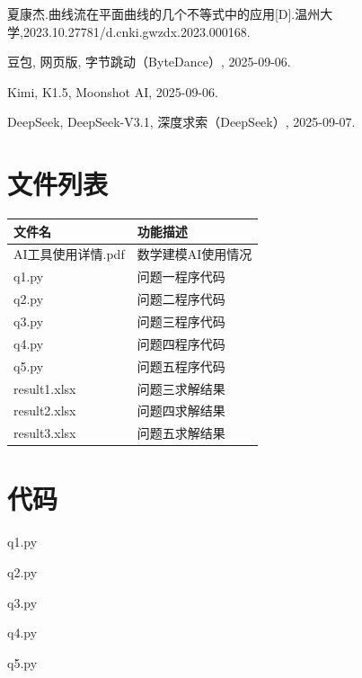 \documentclass[withoutpreface,bwprint]{cumcmthesis}
\numberwithin{equation}{section} %
\numberwithin{figure}{section} %
\numberwithin{table}{section}  %
\begin{document}
\newpage

\begin{thebibliography}{20}

夏康杰.曲线流在平面曲线的几个不等式中的应用[D].温州大学,2023.10.27781/d.cnki.gwzdx.2023.000168.

豆包, 网页版, 字节跳动（ByteDance）, 2025-09-06.

Kimi, K1.5, Moonshot AI, 2025-09-06.

DeepSeek, DeepSeek-V3.1, 深度求索（DeepSeek）, 2025-09-07.



\end{thebibliography}

\newpage
\begin{appendices}
\section{文件列表}
\begin{table}[H]
\centering
\begin{tabularx}{\textwidth}{LL}
\toprule
文件名   & 功能描述 \\
\midrule
AI工具使用详情.pdf & 数学建模AI使用情况\\ 
q1.py & 问题一程序代码\\
q2.py & 问题二程序代码 \\
q3.py & 问题三程序代码 \\
q4.py & 问题四程序代码 \\
q5.py & 问题五程序代码 \\
result1.xlsx & 问题三求解结果 \\
result2.xlsx & 问题四求解结果 \\
result3.xlsx & 问题五求解结果 \\
\bottomrule
\end{tabularx}
\label{tab:文件列表}
\end{table}

\section{代码}
\noindent q1.py

q2.py

q3.py

q4.py

q5.py

\end{appendices}
\end{document}

